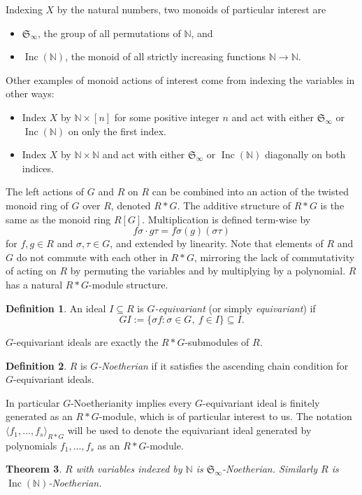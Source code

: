 \documentclass[10pt]{amsart}
\newtheorem{theorem}{Theorem}[section]
\theoremstyle{definition}
\newtheorem{definition}[theorem]{Definition}
\theoremstyle{remark}
\numberwithin{equation}{section}
\newcommand{\B}[1]{\mathbb #1}
\newcommand{\F}[1]{\mathfrak #1}
\newcommand{\<}{\langle}
\renewcommand{\>}{\rangle}
\newcommand{\ideal}[1]{\langle #1 \rangle}
\newcommand{\Inc}{\operatorname{Inc}(\B N)}
\begin{document}
Indexing $X$ by the natural numbers, two monoids of particular interest are
\begin{itemize}
 \item ${\mathfrak S}_{\infty}$, the group of all permutations of $\B N$, and
 \item $\Inc$, the monoid of all strictly increasing functions $\B N \to \B N$.
\end{itemize}
Other examples of monoid actions of interest come from indexing the variables in other ways:
\begin{itemize}
 \item Index $X$ by $\B N \times [n]$ for some positive integer $n$ and act with either $\F S_\infty$ or $\Inc$ on only the first index.
 \item Index $X$ by $\B N \times \B N$ and act with either $\F S_\infty$ or $\Inc$ diagonally on both indices.
\end{itemize}


The left actions of $G$ and $R$ on $R$ can be combined into an action of the twisted monoid ring of $G$ over $R$, denoted $R*G$.  The additive structure of $R*G$ is the same as the monoid ring $R[G]$.  Multiplication is defined term-wise by
 \[ f\sigma\cdot g\tau = f\sigma(g)(\sigma\tau) \]
for $f,g\in R$ and $\sigma,\tau\in G$, and extended by linearity.  Note that elements of $R$ and $G$ do not commute with each other in $R*G$, mirroring the lack of commutativity of acting on $R$ by permuting the variables and by multiplying by a polynomial.  $R$ has a natural $R*G$-module structure.

\begin{definition}
 An ideal $I \subseteq R$ is $G$\textit{-equivariant}
(or simply \textit{equivariant}) if \[ GI := \{\sigma f
: \sigma \in G, \ f \in I\} \subseteq I.\]
\end{definition}
$G$-equivariant ideals are exactly the $R*G$-submodules of $R$.

\begin{definition}
$R$ is $G${\em -Noetherian} if it satisfies the ascending chain condition for $G$-equivariant ideals.
\end{definition}
In particular $G$-Noetherianity implies every $G$-equivariant ideal is finitely generated as an $R*G$-module, which is of particular interest to us.  The notation $\ideal{f_1,\ldots,f_s}_{R*G}$ will be used to denote the equivariant ideal generated by polynomials $f_1,\ldots,f_s$ as an $R*G$-module.

\begin{theorem}\label{onevarfinitegenthm}\cite{Aschenbrenner-Hillar:finite-generation}
$R$ with variables indexed by $\B N$ is $\F S_\infty$-Noetherian.  Similarly $R$ is $\Inc$-Noetherian.
\end{theorem}
\end{document}
